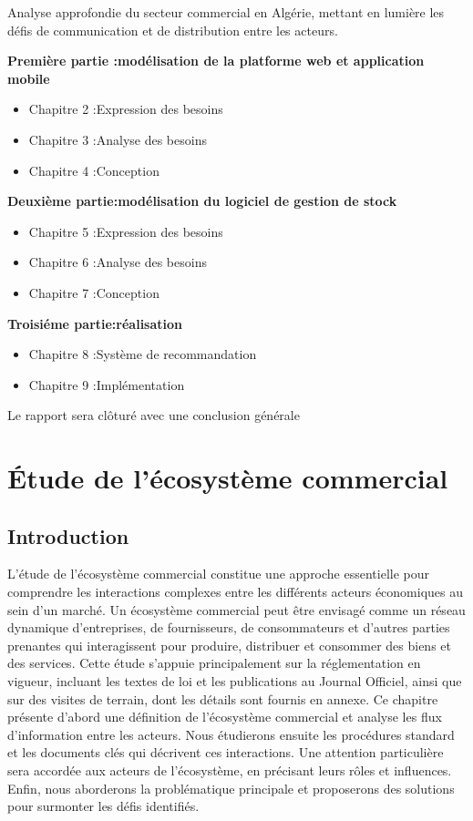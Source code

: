 \documentclass[edit,12pt,a4paper,ChapStyle,oneside,doubleinterligne]{report}
\begin{document}
Analyse approfondie du secteur commercial en Algérie, mettant en lumière les défis de communication et de distribution entre les acteurs.

\textbf{Première partie :modélisation de la platforme web et application mobile}
\begin{itemize}
    \item Chapitre 2 :Expression des besoins
    \item Chapitre 3 :Analyse des besoins 
    \item Chapitre 4 :Conception
\end{itemize}
\textbf{Deuxième partie:modélisation du logiciel de gestion de stock}
\begin{itemize}
    \item Chapitre 5 :Expression des besoins
    \item Chapitre 6 :Analyse des besoins 
    \item Chapitre 7 :Conception
\end{itemize}
\textbf{Troisiéme partie:réalisation}
\begin{itemize}
    \item Chapitre 8 :Système de recommandation

    \item Chapitre 9 :Implémentation 
\end{itemize}
Le rapport sera clôturé avec une conclusion générale


\chapter{Étude de l'écosystème commercial}
\newpage
\section{Introduction}
L'étude de l'écosystème commercial constitue une approche essentielle pour comprendre les interactions complexes entre les différents acteurs économiques au sein d'un marché. Un écosystème commercial peut être envisagé comme un réseau dynamique d'entreprises, de fournisseurs, de consommateurs et d'autres parties prenantes qui interagissent pour produire, distribuer et consommer des biens et des services.
\newline Cette étude s'appuie principalement sur la réglementation en vigueur, incluant les textes de loi et les publications au Journal Officiel, ainsi que sur des visites de terrain, dont les détails sont fournis en annexe.
\newline Ce chapitre présente d'abord une définition de l'écosystème commercial et analyse les flux d'information entre les acteurs. Nous étudierons ensuite les procédures standard et les documents clés qui décrivent ces interactions. Une attention particulière sera accordée aux acteurs de l'écosystème, en précisant leurs rôles et influences.
\newline Enfin, nous aborderons la problématique principale et proposerons des solutions pour surmonter les défis identifiés.
\end{document}
